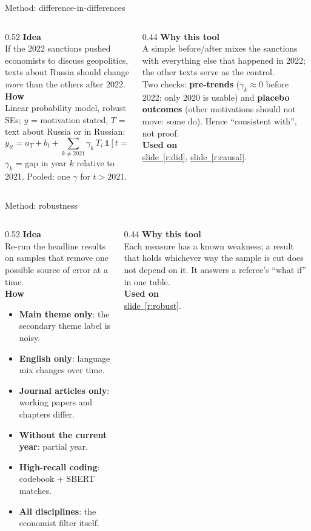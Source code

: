 \documentclass[aspectratio=169,10pt]{beamer}
\newcommand{\usedon}[1]{\hyperref[#1]{\textcolor{c4}{slide~\ref*{#1}}}}
\newcommand{\mhead}[1]{\textcolor{c1}{\textbf{#1}}\\[1pt]}
\begin{document}
\begin{frame}{Method: difference-in-differences}
\begin{columns}[T]
\begin{column}{0.52\textwidth}\footnotesize
\mhead{Idea}
If the 2022 sanctions pushed economists to discuss geopolitics, texts about Russia should change \emph{more} than the others after 2022.\\[4pt]
\mhead{How}
Linear probability model, robust SEs; $y$ = motivation stated, $T$ = text about Russia or in Russian:
\[ y_{it} = a_T + b_t + \sum_{k\neq 2021} \gamma_k\, T_i\,\mathbf{1}[t=k] + \varepsilon_{it} \]
$\gamma_k$ = gap in year $k$ relative to 2021. Pooled: one $\gamma$ for $t > 2021$.
\end{column}
\begin{column}{0.44\textwidth}\footnotesize
\mhead{Why this tool}
A simple before/after mixes the sanctions with everything else that happened in 2022; the other texts serve as the control.\\[3pt]
Two checks: \textbf{pre-trends} ($\gamma_k \approx 0$ before 2022: only 2020 is usable) and \textbf{placebo outcomes} (other motivations should not move: some do). Hence ``consistent with'', not proof.\\[6pt]
\mhead{Used on}
\usedon{r:did}, \usedon{r:causal}.
\end{column}
\end{columns}
\end{frame}

\begin{frame}{Method: robustness}
\begin{columns}[T]
\begin{column}{0.52\textwidth}\footnotesize
\mhead{Idea}
Re-run the headline results on samples that remove one possible source of error at a time.\\[4pt]
\mhead{How}
\begin{itemize}\setlength\itemsep{1pt}
\item \textbf{Main theme only}: the secondary theme label is noisy.
\item \textbf{English only}: language mix changes over time.
\item \textbf{Journal articles only}: working papers and chapters differ.
\item \textbf{Without the current year}: partial year.
\item \textbf{High-recall coding}: codebook + SBERT matches.
\item \textbf{All disciplines}: the economist filter itself.
\end{itemize}
\end{column}
\begin{column}{0.44\textwidth}\footnotesize
\mhead{Why this tool}
Each measure has a known weakness; a result that holds whichever way the sample is cut does not depend on it. It answers a referee's ``what if'' in one table.\\[6pt]
\mhead{Used on}
\usedon{r:robust}.
\end{column}
\end{columns}
\end{frame}
\end{document}
